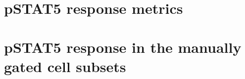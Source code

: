 %

\section{pSTAT5 response metrics}
\section{pSTAT5 response in the manually gated cell subsets}





%

